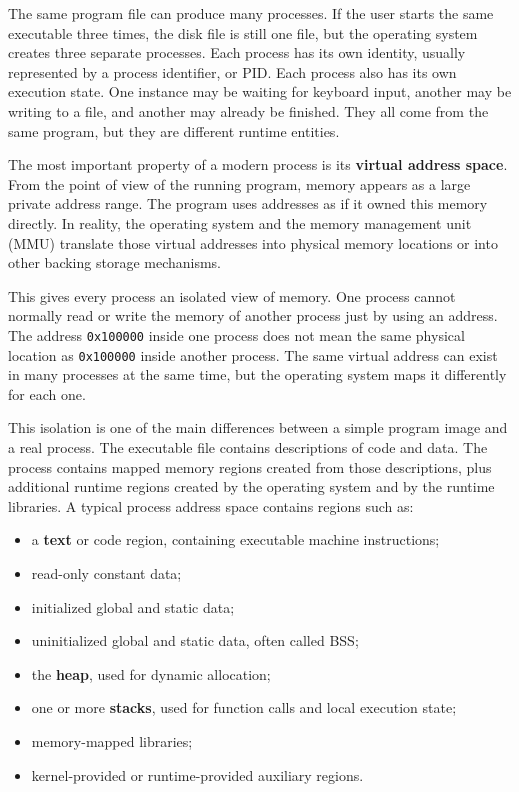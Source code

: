 \documentclass[a4paper,twoside]{report}
\begin{document}
The same program file can produce many processes. If the user starts the same executable three times, the disk file is still one file, but the operating system creates three separate processes. Each process has its own identity, usually represented by a process identifier, or PID. Each process also has its own execution state. One instance may be waiting for keyboard input, another may be writing to a file, and another may already be finished. They all come from the same program, but they are different runtime entities.

The most important property of a modern process is its \textbf{virtual address space}. From the point of view of the running program, memory appears as a large private address range. The program uses addresses as if it owned this memory directly. In reality, the operating system and the memory management unit (MMU) translate those virtual addresses into physical memory locations or into other backing storage mechanisms.

This gives every process an isolated view of memory. One process cannot normally read or write the memory of another process just by using an address. The address \texttt{0x100000} inside one process does not mean the same physical location as \texttt{0x100000} inside another process. The same virtual address can exist in many processes at the same time, but the operating system maps it differently for each one.

This isolation is one of the main differences between a simple program image and a real process. The executable file contains descriptions of code and data. The process contains mapped memory regions created from those descriptions, plus additional runtime regions created by the operating system and by the runtime libraries. A typical process address space contains regions such as:

\begin{itemize}
    \item a \textbf{text} or code region, containing executable machine instructions;
    \item read-only constant data;
    \item initialized global and static data;
    \item uninitialized global and static data, often called BSS;
    \item the \textbf{heap}, used for dynamic allocation;
    \item one or more \textbf{stacks}, used for function calls and local execution state;
    \item memory-mapped libraries;
    \item kernel-provided or runtime-provided auxiliary regions.
\end{itemize}
\end{document}
